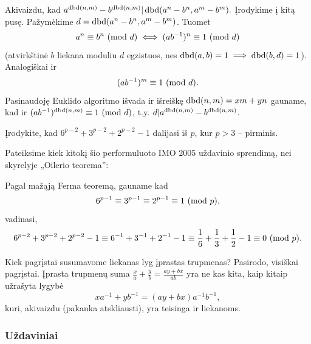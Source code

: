 \begin{sprendimas}
Akivaizdu, kad $a^{\operatorname{dbd}(n,m)}-b^{\operatorname{dbd}(n,m)} | \operatorname{dbd}(a^n - b^n, a^m - b^m).$
Įrodykime į kitą pusę. Pažymėkime $d = \operatorname{dbd}(a^n - b^n, a^m - b^m)$. Tuomet
$$a^n \equiv b^n \ (\text{mod } d) \iff (ab^{-1})^n \equiv 1 \ (\text{mod } d)$$ (atvirkštinė $b$
liekana moduliu $d$ egzistuos, nes $\operatorname{dbd}(a,b)=1 \implies \operatorname{dbd}(b,d)=1$).
Analogiškai ir $$(ab^{-1})^m \equiv 1 \ (\text{mod } d).$$ Pasinaudoję Euklido algoritmo
išvada ir išreiškę $\operatorname{dbd}(n,m) = xm + yn$ gauname, kad ir
$(ab^{-1})^{\operatorname{dbd}(n,m)} \equiv 1 \ (\text{mod } d)$, t.y.
$d|a^{\operatorname{dbd}(n,m)}-b^{\operatorname{dbd}(n,m)}$.
\end{sprendimas}

\begin{pavnr}
  Įrodykite, kad $6^{p-2} + 3^{p-2} +  2^{p-2} - 1$ dalijasi iš $p$, kur
  $p>3$ -- pirminis.
\end{pavnr}

\begin{sprendimas}
  Pateiksime kiek kitokį šio performuluoto IMO 2005 uždavinio sprendimą,
  nei skyrelyje „Oilerio teorema'':

  Pagal mažąją Ferma teoremą, gauname kad
  $$6^{p-1} \equiv 3^{p-1} \equiv  2^{p-1} \equiv 1\ (\text{mod } p),$$ vadinasi,
  $$6^{p-2} + 3^{p-2} +  2^{p-2} - 1 \equiv 6^{-1} + 3^{-1} + 2^{-1} -1
  \equiv \frac{1}{6} + \frac{1}{3} + \frac{1}{2} - 1 \equiv 0\ (\text{mod } p).$$

  Kiek pagrįstai susumavome liekanas lyg įprastas trupmenas? Pasirodo,
  visiškai pagrįstai. Įprasta trupmenų suma $\frac{x}{a} + \frac{y}{b} =
  \frac{ay+bx}{ab}$ yra ne kas kita, kaip kitaip užrašyta lygybė
  $$xa^{-1} + yb^{-1} = (ay + bx)a^{-1}b^{-1},$$ kuri, akivaizdu (pakanka
  atskliausti), yra teisinga ir liekanoms.
\end{sprendimas}



\subsubsection{Uždaviniai}

